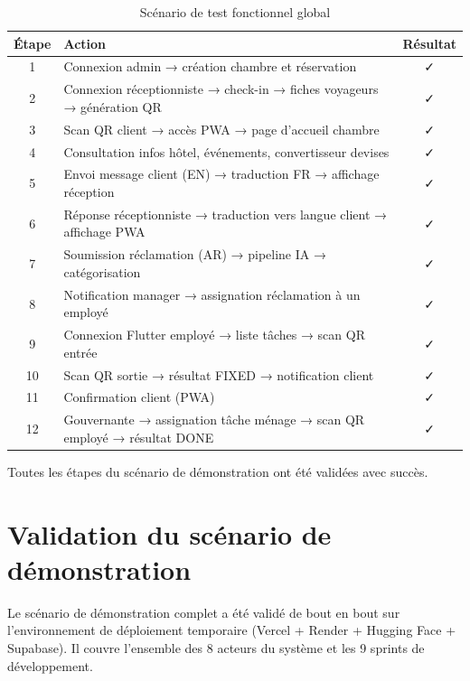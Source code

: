 \begin{table}[H]
\centering
\caption{Scénario de test fonctionnel global}
\label{tab:tests_fonctionnels}
\begin{tabular}{|c|l|c|}
\hline
\textbf{Étape} & \textbf{Action} & \textbf{Résultat} \\
\hline
1 & Connexion admin → création chambre et réservation & ✓ \\
\hline
2 & Connexion réceptionniste → check-in → fiches voyageurs → génération QR & ✓ \\
\hline
3 & Scan QR client → accès PWA → page d'accueil chambre & ✓ \\
\hline
4 & Consultation infos hôtel, événements, convertisseur devises & ✓ \\
\hline
5 & Envoi message client (EN) → traduction FR → affichage réception & ✓ \\
\hline
6 & Réponse réceptionniste → traduction vers langue client → affichage PWA & ✓ \\
\hline
7 & Soumission réclamation (AR) → pipeline IA → catégorisation & ✓ \\
\hline
8 & Notification manager → assignation réclamation à un employé & ✓ \\
\hline
9 & Connexion Flutter employé → liste tâches → scan QR entrée & ✓ \\
\hline
10 & Scan QR sortie → résultat FIXED → notification client & ✓ \\
\hline
11 & Confirmation client (PWA) & ✓ \\
\hline
12 & Gouvernante → assignation tâche ménage → scan QR employé → résultat DONE & ✓ \\
\hline
\end{tabular}
\end{table}

Toutes les étapes du scénario de démonstration ont été validées avec succès.

\section{Validation du scénario de démonstration}
\label{sec:validation_demo}

Le scénario de démonstration complet a été validé de bout en bout sur l'environnement de déploiement temporaire (Vercel + Render + Hugging Face + Supabase). Il couvre l'ensemble des 8 acteurs du système et les 9 sprints de développement.

